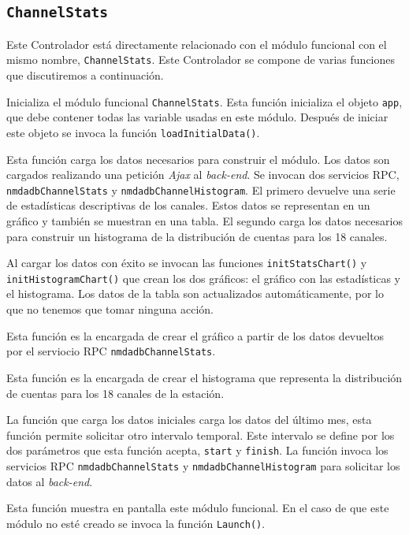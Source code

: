 	\subsection{\texttt{ChannelStats}}
		Este Controlador está directamente relacionado con el módulo funcional con el mismo nombre, \texttt{ChannelStats}. Este Controlador se
		compone de varias funciones que discutiremos a continuación.
		\begin{description}[style=unboxed,leftmargin=0cm]
			\item[\texttt{Launch()}]
				Inicializa el módulo funcional \texttt{ChannelStats}. Esta función inicializa el objeto \texttt{app}, que debe
				contener todas las variable usadas en este módulo. Después de iniciar este objeto se invoca la función
				\texttt{loadInitialData()}.
			\item[\texttt{loadInitialData()}]
				Esta función carga los datos necesarios para construir el módulo. Los datos son cargados realizando una petición
				\emph{Ajax} al \emph{back-end}. Se invocan dos servicios RPC, \texttt{nmdadbChannelStats} y
				\texttt{nmdadbChannelHistogram}. El primero devuelve una serie de estadísticas descriptivas de los canales. Estos
				datos se representan en un gráfico y también se muestran en una tabla. El segundo carga los datos necesarios para
				construir un histograma de la distribución de cuentas para los 18 canales.
				\par
				Al cargar los datos con éxito se invocan las funciones \texttt{initStatsChart()} y \texttt{initHistogramChart()}
				que  crean los dos gráficos: el gráfico con las estadísticas y el histograma. Los datos de la tabla son actualizados
				automáticamente, por lo que no tenemos que tomar ninguna acción.
			\item[\texttt{initStatsChart()}]
				Esta función es la encargada de crear el gráfico a partir de los datos devueltos por el serviocio RPC
				\texttt{nmdadbChannelStats}. 
			\item[\texttt{initChannelHistogram()}]
				Esta función es la encargada de crear el histograma que representa la distribución de cuentas para los 18 canales de
				la estación.
			\item[\texttt{searchInterval()}]
				La función que carga los datos iniciales carga los datos del último mes, esta función permite solicitar otro intervalo
				temporal. Este intervalo se define por los dos parámetros que esta función acepta, \texttt{start} y \texttt{finish}.
				La función invoca los servicios RPC \texttt{nmdadbChannelStats} y \texttt{nmdadbChannelHistogram} para solicitar los
				datos al \emph{back-end}.
			\item[\texttt{showModule()}]
				Esta función muestra en pantalla este módulo funcional. En el caso de que este módulo no esté creado se invoca la
				función \texttt{Launch()}.
		\end{description}
